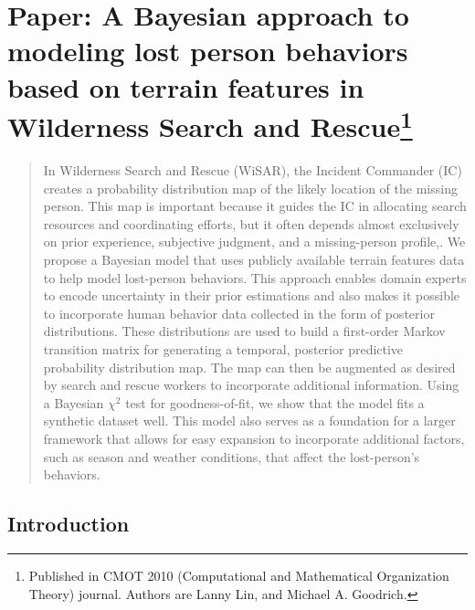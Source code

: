 \chapter[Paper: A Bayesian approach to modeling lost person behaviors based on terrain features in Wilderness Search and Rescue]{Paper: A Bayesian approach to modeling lost person behaviors based on terrain features in Wilderness Search and Rescue\footnote {Published in CMOT 2010 (Computational and Mathematical Organization Theory) journal. Authors are Lanny Lin, and Michael A. Goodrich.}}
\label{chap:CMOT2010}

\begin{abstract}
In Wilderness Search and Rescue (WiSAR), the Incident Commander (IC) creates a probability distribution map of the likely location of the missing person. This map is important because it guides the IC in allocating search resources and coordinating efforts, but it often depends almost exclusively on prior experience, subjective judgment, and a missing-person profile,. We propose a Bayesian model that uses publicly available terrain features data to help model lost-person behaviors. This approach enables domain experts to encode uncertainty in their prior estimations and also makes it possible to incorporate human behavior data collected in the form of posterior distributions. These distributions are used to build a first-order Markov transition matrix for generating a temporal, posterior predictive probability distribution map. The map can then be augmented as desired by search and rescue workers to incorporate additional information. Using a Bayesian $\chi^2$ test for goodness-of-fit, we show that the model fits a synthetic dataset well. This model also serves as a foundation for a larger framework that allows for easy expansion to incorporate additional factors, such as season and weather conditions, that affect the lost-person's behaviors.
\end{abstract}

\section{Introduction}
\label{3intro}

